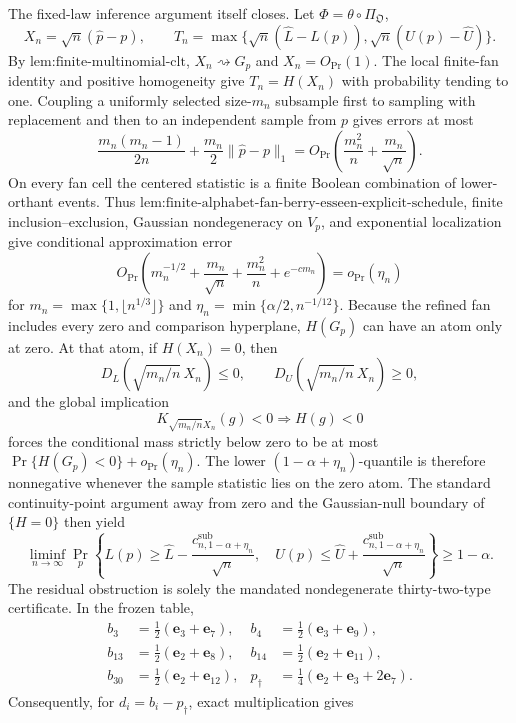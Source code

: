 The fixed-law inference argument itself closes.  Let \(\Phi=\theta\circ\Pi_{\mathfrak O}\),
\[
X_n=\sqrt n(\widehat p-p),\qquad
T_n=\max\{\sqrt n(\widehat L-L(p)),\sqrt n(U(p)-\widehat U)\}.
\]
By \(\text{lem:finite-multinomial-clt}\), \(X_n\rightsquigarrow G_p\) and \(X_n=O_{\Pr}(1)\).  The local finite-fan identity and positive homogeneity give \(T_n=H(X_n)\) with probability tending to one.  Coupling a uniformly selected size-\(m_n\) subsample first to sampling with replacement and then to an independent sample from \(p\) gives errors at most
\[
\frac{m_n(m_n-1)}{2n}
+\frac{m_n}{2}\|\widehat p-p\|_1
=O_{\Pr}\left(\frac{m_n^2}{n}+\frac{m_n}{\sqrt n}\right).
\]
On every fan cell the centered statistic is a finite Boolean combination of lower-orthant events.  Thus \(\text{lem:finite-alphabet-fan-berry-esseen-explicit-schedule}\), finite inclusion--exclusion, Gaussian nondegeneracy on \(V_p\), and exponential localization give conditional approximation error
\[
O_{\Pr}\left(m_n^{-1/2}+\frac{m_n}{\sqrt n}+\frac{m_n^2}{n}+e^{-c m_n}\right)=o_{\Pr}(\eta_n)
\]
for \(m_n=\max\{1,\lfloor n^{1/3}\rfloor\}\) and \(\eta_n=\min\{\alpha/2,n^{-1/12}\}\).  Because the refined fan includes every zero and comparison hyperplane, \(H(G_p)\) can have an atom only at zero.  At that atom, if \(H(X_n)=0\), then
\[
D_L(\sqrt{m_n/n}\,X_n)\leq0,
\qquad
D_U(\sqrt{m_n/n}\,X_n)\geq0,
\]
and the global implication
\[
K_{\sqrt{m_n/n}X_n}(g)<0\Longrightarrow H(g)<0
\]
forces the conditional mass strictly below zero to be at most \(\Pr\{H(G_p)<0\}+o_{\Pr}(\eta_n)\).  The lower \((1-\alpha+\eta_n)\)-quantile is therefore nonnegative whenever the sample statistic lies on the zero atom.  The standard continuity-point argument away from zero and the Gaussian-null boundary of \(\{H=0\}\) then yield
\[
\liminf_{n\to\infty}\Pr_p\left\{
L(p)\geq\widehat L-\frac{c^{\mathrm{sub}}_{n,1-\alpha+\eta_n}}{\sqrt n},\quad
U(p)\leq\widehat U+\frac{c^{\mathrm{sub}}_{n,1-\alpha+\eta_n}}{\sqrt n}
\right\}\geq1-\alpha.
\]
The residual obstruction is solely the mandated nondegenerate thirty-two-type certificate.  In the frozen table,
\[
\begin{aligned}
b_3&=\tfrac12(\mathbf e_3+\mathbf e_7),&
b_4&=\tfrac12(\mathbf e_3+\mathbf e_9),\\
b_{13}&=\tfrac12(\mathbf e_2+\mathbf e_8),&
b_{14}&=\tfrac12(\mathbf e_2+\mathbf e_{11}),\\
b_{30}&=\tfrac12(\mathbf e_2+\mathbf e_{12}),&
p_\dagger&=\tfrac14(\mathbf e_2+\mathbf e_3+2\mathbf e_7).
\end{aligned}
\]
Consequently, for \(d_i=b_i-p_\dagger\), exact multiplication gives
